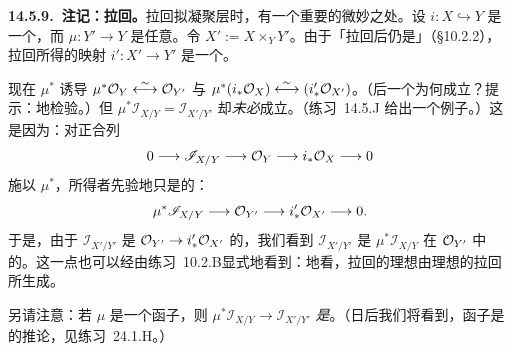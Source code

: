 \textbf{14.5.9.\ 注记：拉回\trIdealSheaf。}\quad 拉回拟凝聚\emph{\trIdeal}层时，有一个重要的微妙之处。设 $i\colon X\hookrightarrow Y$ 是一个\trClosedEmbedding，而 $\mu\colon Y'\to Y$ 是任意\trMorphism。令 $X':=X\times_Y Y'$。由于「\trClosedEmbedding{}拉回后仍是\trClosedEmbedding」（\S10.2.2），拉回所得的映射 $i'\colon X'\to Y'$ 是一个\trClosedEmbedding。
\begin{center}
\end{center}
现在 $\mu^*$ 诱导\trCanonical{}\trIsomorphism{} $\mu^*\mathcal{O}_Y\overset{\sim}{\longleftrightarrow}\mathcal{O}_{Y'}$ 与 $\mu^*(i_*\mathcal{O}_X)\overset{\sim}{\longleftrightarrow}(i'_*\mathcal{O}_{X'})$。（后一个\trIsomorphism{}为何成立？提示：\trAffineLocal{}地检验。）但 $\mu^*\mathscr{I}_{X/Y}=\mathscr{I}_{X'/Y'}$ 却\emph{未必}成立。（\mbox{练习~14.5.J} 给出一个例子。）这是因为：对\trClosedSubscheme{}正合列
\[
0\longrightarrow\mathscr{I}_{X/Y}\longrightarrow\mathcal{O}_Y\longrightarrow i_*\mathcal{O}_X\longrightarrow 0
\]
施以 $\mu^*$，所得者先验地只是\trRightExact{}的：
\[
\mu^*\mathscr{I}_{X/Y}\longrightarrow\mathcal{O}_{Y'}\longrightarrow i'_*\mathcal{O}_{X'}\longrightarrow 0.
\]
于是，由于 $\mathscr{I}_{X'/Y'}$ 是 $\mathcal{O}_{Y'}\to i'_*\mathcal{O}_{X'}$ 的\trKernel，我们看到 $\mathscr{I}_{X'/Y'}$ 是 $\mu^*\mathscr{I}_{X/Y}$ 在 $\mathcal{O}_{Y'}$ 中的\trImage。这一点也可以经由\mbox{练习~10.2.B}显式地看到：\trAffineLocal{}地看，拉回的理想由理想的拉回所生成。

另请注意：若 $\mu$ 是一个\trExact{}函子，则 $\mu^*\mathscr{I}_{X/Y}\to\mathscr{I}_{X'/Y'}$ \emph{是}\trIsomorphism。（日后我们将看到，\trExact{}函子是\trFlatness{}的推论，见\mbox{练习~24.1.H}。）

